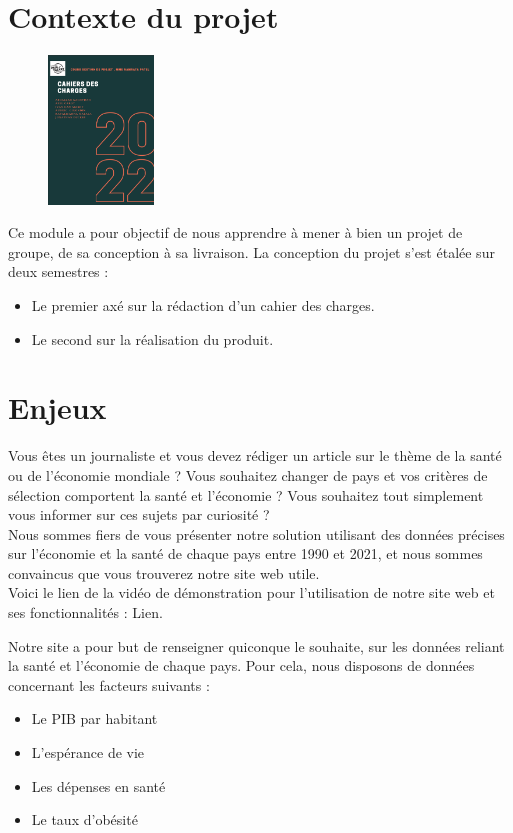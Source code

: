 \documentclass[12pt,a4paper]{report}
\begin{document}
\section{Contexte du projet}
\begin{figure}
    \vspace{-2.5em} %
    \includegraphics[width=0.25\textwidth]{images/image_cahier_charge.png}
\end{figure}
Ce module a pour objectif de nous apprendre à mener à bien un projet de groupe, de sa conception à sa livraison. La conception du projet s'est étalée sur deux semestres :
\begin{itemize}
    \item Le premier axé sur la rédaction d'un cahier des charges.
    \item Le second sur la réalisation du produit. \\
\end{itemize}

\section{Enjeux}
    Vous êtes un journaliste et vous devez rédiger un article sur le thème de la santé ou de l’économie mondiale ? Vous souhaitez changer de pays et vos critères de sélection comportent la santé et l’économie ? Vous souhaitez tout simplement vous informer sur ces sujets par curiosité ? \\

	Nous sommes fiers de vous présenter notre solution utilisant des données précises sur l’économie et la santé de chaque pays entre 1990 et 2021, et nous sommes convaincus que vous trouverez notre site web utile. \\

    Voici le lien de la vidéo de démonstration pour l'utilisation de notre site web et ses fonctionnalités : Lien. 

	Notre site a pour but de renseigner quiconque le souhaite, sur les données reliant la santé et l'économie de chaque pays. Pour cela, nous disposons de données concernant les facteurs suivants : 
\begin{itemize}
    \item Le PIB par habitant
    \item L'espérance de vie
    \item Les dépenses en santé
    \item Le taux d'obésité \\
\end{itemize}	
	
\end{document}
